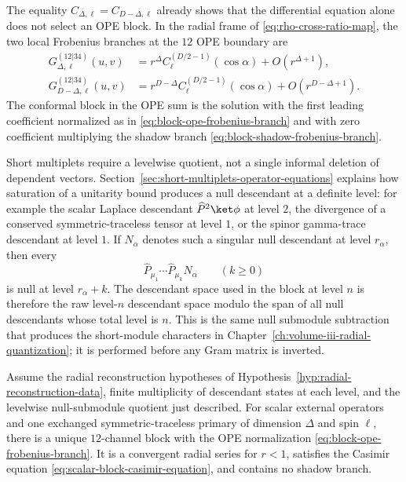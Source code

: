 The equality \(C_{\Delta,\ell}=C_{D-\Delta,\ell}\) already shows that the
differential equation alone does not select an OPE block.  In the radial frame
of \eqref{eq:rho-cross-ratio-map}, the two local Frobenius branches at the
\(12\) OPE boundary are
\begin{align}
  G_{\Delta,\ell}^{(12|34)}(u,v)
  &=
  r^\Delta C_\ell^{(D/2-1)}(\cos\alpha)
  +O(r^{\Delta+1}),
  \label{eq:block-ope-frobenius-branch}
  \\
  G_{D-\Delta,\ell}^{(12|34)}(u,v)
  &=
  r^{D-\Delta} C_\ell^{(D/2-1)}(\cos\alpha)
  +O(r^{D-\Delta+1}).
  \label{eq:block-shadow-frobenius-branch}
\end{align}
The conformal block in the OPE sum is the solution with the first leading
coefficient normalized as in
\eqref{eq:block-ope-frobenius-branch} and with zero coefficient multiplying the
shadow branch \eqref{eq:block-shadow-frobenius-branch}.

Short multiplets require a levelwise quotient, not a single informal deletion
of dependent vectors.  Section~\ref{sec:short-multiplets-operator-equations}
explains how saturation of a unitarity bound produces a null descendant at a
definite level: for example the scalar Laplace descendant
\(\widehat P^2\ket\phi\) at level \(2\), the divergence of a conserved
symmetric-traceless tensor at level \(1\), or the spinor gamma-trace descendant
at level \(1\).  If \(N_{\alpha}\) denotes such a singular null descendant at
level \(r_\alpha\), then every
\[
  \widehat P_{\mu_1}\cdots\widehat P_{\mu_k}N_{\alpha}
  \qquad (k\ge0)
\]
is null at level \(r_\alpha+k\).  The descendant space used in the block at
level \(n\) is therefore the raw level-\(n\) descendant space modulo the span of
all null descendants whose total level is \(n\).  This is the same null
submodule subtraction that produces the short-module characters in
Chapter~\ref{ch:volume-iii-radial-quantization}; it is performed before any
Gram matrix is inverted.

\begin{theorem}
\label{thm:casimir-block-local-existence-uniqueness}
Assume the radial reconstruction hypotheses of
Hypothesis~\ref{hyp:radial-reconstruction-data}, finite multiplicity of
descendant states at each level, and the levelwise null-submodule quotient just
described.  For scalar external operators and one exchanged symmetric-traceless
primary of dimension \(\Delta\) and spin \(\ell\), there is a unique
\(12\)-channel block with the OPE normalization
\eqref{eq:block-ope-frobenius-branch}.  It is a convergent radial series for
\(r<1\), satisfies the Casimir equation
\eqref{eq:scalar-block-casimir-equation}, and contains no shadow branch.
\end{theorem}

